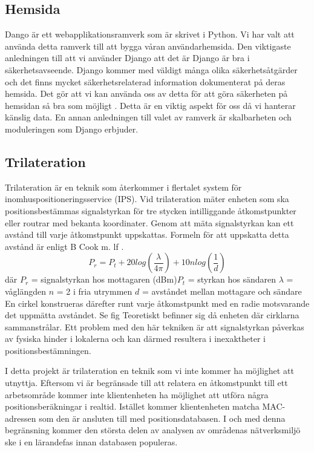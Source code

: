 \documentclass[swedish, a4paper,12pt]{article}
\begin{document}
\subsection{Hemsida}
Dango är ett webapplikationsramverk som är skrivet i Python. Vi har valt att använda detta ramverk till att bygga våran användarhemsida. Den viktigaste anledningen till att vi använder Django att det är Django är bra i säkerhetsavseende. Django kommer med väldigt många olika säkerhetsåtgärder och det finns mycket säkerhetsrelaterad information dokumenterat på deras hemsida. Det gör att vi kan använda oss av detta för att göra säkerheten på hemsidan så bra som möjligt \cite{securityInDjango}. Detta är en viktig aspekt för oss då vi hanterar känslig data. En annan anledningen till valet av ramverk är skalbarheten och moduleringen som Django erbjuder. %

\iffalse
\subsection{Trilateration}
Trilateration är en teknik som återkommer i flertalet system för inomhuspositioneringsservice (IPS). Vid trilateration mäter enheten som ska positionsbestämmas signalstyrkan för tre stycken intilliggande åtkomstpunkter eller routrar med bekanta koordinater. Genom att mäta signalstyrkan kan ett avstånd till varje åtkomstpunkt uppskattas. Formeln för att uppskatta detta avstånd är enligt B Cook m. lf \cite{cook2005indoor}.
\newline
$$ P_r = P_t + 20log(\frac{\lambda}{4\pi}) + 10nlog(\frac{1}{d})$$
där
$  P_r $ = signalstyrkan hos mottagaren (dBm)\newline $P_t$ = styrkan hos sändaren\newline
$\lambda$ = våglängden\newline
$ n $ = 2 i fria utrymmen\newline
$ d $ = avståndet mellan mottagare och sändare
\bigskip
\newline
En cirkel konstrueras därefter runt varje åtkomstpunkt med en radie motsvarande det uppmätta avståndet. Se fig %
Teoretiskt befinner sig då enheten där cirklarna sammanstrålar. Ett problem med den här tekniken är att signalstyrkan påverkas av fysiska hinder i lokalerna och kan därmed resultera i inexaktheter i positionsbestämningen.

I detta projekt är trilateration en teknik som vi inte kommer ha möjlighet att utnyttja. Eftersom vi är begränsade till att relatera en åtkomstpunkt till ett arbetsområde kommer inte klientenheten ha möjlighet att utföra några positionsberäkningar i realtid. Istället kommer klientenheten matcha MAC-adressen som den är ansluten till med positionsdatabasen. I och med denna begränsning kommer den största delen av analysen av områdenas nätverksmiljö ske i en lärandefas innan databasen populeras.
\end{document}
